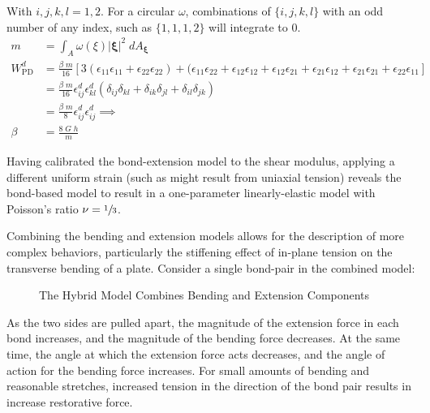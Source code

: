 \documentclass[preprint,review,12pt]{elsarticle}
\newcommand{\diagrampath}{./diagrams}
\begin{document}
%
With $i, j, k, l = 1,2$. For a circular $\omega$, combinations of $\{i,j,k,l\}$ with an odd number of any index, such as $\{1,1,1,2\}$ will integrate to 0.
%
\begin{align*}
    m &= \int_A \omega(\xi)|\boldsymbol{\xi}|^2\; dA_{\boldsymbol{\xi}} \\
    W^d_\text{PD} &= \frac{\beta \; m}{16}[3(\epsilon_{11}\epsilon_{11}+\epsilon_{22}\epsilon_{22})+(\epsilon_{11}\epsilon_{22}+\epsilon_{12}\epsilon_{12}+\epsilon_{12}\epsilon_{21}+\epsilon_{21}\epsilon_{12}+\epsilon_{21}\epsilon_{21}+\epsilon_{22}\epsilon_{11}]\\
    &= \frac{\beta \; m}{16} \epsilon_{ij}^d \epsilon_{kl}^d (\delta_{ij}\delta_{kl}+\delta_{ik}\delta_{jl}+\delta_{il}\delta_{jk})\\
    &= \frac{\beta \; m}{8} \epsilon_{ij}^d \epsilon_{ij}^d \implies\\
     \beta &= \frac{8 \; G\;h}{m}
\end{align*}
%

Having calibrated the bond-extension model to the shear modulus, applying a different uniform strain (such as might result from uniaxial tension) reveals the bond-based model to result in a one-parameter linearly-elastic model with Poisson's ratio \(\nu=\sfrac{1}{3}\).

Combining the bending and extension models allows for the description of more complex behaviors, particularly the stiffening effect of in-plane tension on the transverse bending of a plate.
Consider a single bond-pair in the combined model:
\begin{figure}
  \label{fig:hybridmodel}
  \centering
  
  \caption{The Hybrid Model Combines Bending and Extension Components}
\end{figure}
As the two sides are pulled apart, the magnitude of the extension force in each bond increases, and the magnitude of the bending force decreases. 
At the same time, the angle at which the extension force acts decreases, and the angle of action for the bending force increases.
For small amounts of bending and reasonable stretches, increased tension in the direction of the bond pair results in increase restorative force.
\end{document}
